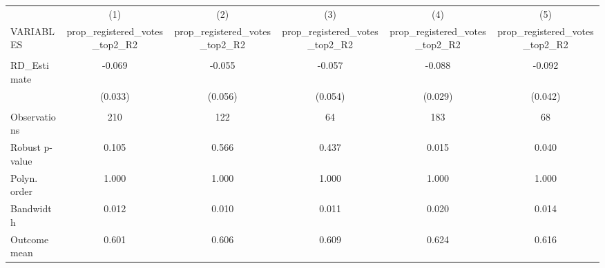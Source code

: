 \documentclass[]{article}
\begin{document}
\begin{tabular}{lccccc} \hline
 & (1) & (2) & (3) & (4) & (5) \\
VARIABLES & prop\_registered\_votes\_top2\_R2 & prop\_registered\_votes\_top2\_R2 & prop\_registered\_votes\_top2\_R2 & prop\_registered\_votes\_top2\_R2 & prop\_registered\_votes\_top2\_R2 \\ \hline
 &  &  &  &  &  \\
RD\_Estimate & -0.069 & -0.055 & -0.057 & -0.088 & -0.092 \\
 & (0.033) & (0.056) & (0.054) & (0.029) & (0.042) \\
 &  &  &  &  &  \\
Observations & 210 & 122 & 64 & 183 & 68 \\
Robust p-value & 0.105 & 0.566 & 0.437 & 0.015 & 0.040 \\
Polyn. order & 1.000 & 1.000 & 1.000 & 1.000 & 1.000 \\
Bandwidth & 0.012 & 0.010 & 0.011 & 0.020 & 0.014 \\
 Outcome mean & 0.601 & 0.606 & 0.609 & 0.624 & 0.616 \\ \hline
\end{tabular}
\end{document}
